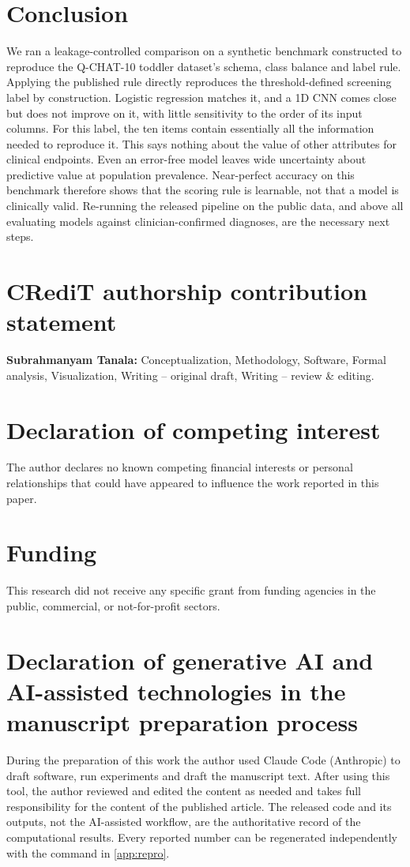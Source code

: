 \documentclass[5p,times,twocolumn]{elsarticle}
\begin{document}
\section{Conclusion}
\label{sec:conclusion}

We ran a leakage-controlled comparison on a synthetic benchmark constructed to reproduce the Q-CHAT-10 toddler dataset's schema, class balance and label rule. Applying the published rule directly reproduces the threshold-defined screening label by construction. Logistic regression matches it, and a 1D CNN comes close but does not improve on it, with little sensitivity to the order of its input columns. For this label, the ten items contain essentially all the information needed to reproduce it. This says nothing about the value of other attributes for clinical endpoints. Even an error-free model leaves wide uncertainty about predictive value at population prevalence. Near-perfect accuracy on this benchmark therefore shows that the scoring rule is learnable, not that a model is clinically valid. Re-running the released pipeline on the public data, and above all evaluating models against clinician-confirmed diagnoses, are the necessary next steps.

\section*{CRediT authorship contribution statement}
\textbf{Subrahmanyam Tanala:} Conceptualization, Methodology, Software, Formal analysis, Visualization, Writing -- original draft, Writing -- review \& editing.

\section*{Declaration of competing interest}
The author declares no known competing financial interests or personal relationships that could have appeared to influence the work reported in this paper.

\section*{Funding}
This research did not receive any specific grant from funding agencies in the public, commercial, or not-for-profit sectors.

\section*{Declaration of generative AI and AI-assisted technologies in the manuscript preparation process}
During the preparation of this work the author used Claude Code (Anthropic) to draft software, run experiments and draft the manuscript text. After using this tool, the author reviewed and edited the content as needed and takes full responsibility for the content of the published article. The released code and its outputs, not the AI-assisted workflow, are the authoritative record of the computational results. Every reported number can be regenerated independently with the command in \ref{app:repro}.
\end{document}
